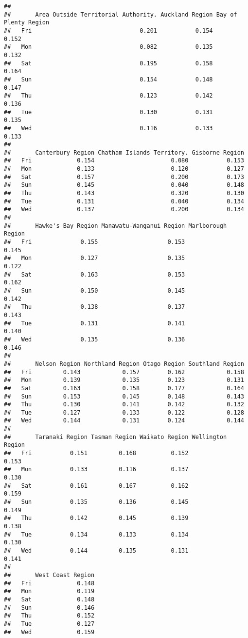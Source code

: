 \documentclass[
  10pt,
]{article}
\begin{document}
\begin{verbatim}
##      
##       Area Outside Territorial Authority. Auckland Region Bay of Plenty Region
##   Fri                               0.201           0.154                0.152
##   Mon                               0.082           0.135                0.132
##   Sat                               0.195           0.158                0.164
##   Sun                               0.154           0.148                0.147
##   Thu                               0.123           0.142                0.136
##   Tue                               0.130           0.131                0.135
##   Wed                               0.116           0.133                0.133
##      
##       Canterbury Region Chatham Islands Territory. Gisborne Region
##   Fri             0.154                      0.080           0.153
##   Mon             0.133                      0.120           0.127
##   Sat             0.157                      0.200           0.173
##   Sun             0.145                      0.040           0.148
##   Thu             0.143                      0.320           0.130
##   Tue             0.131                      0.040           0.134
##   Wed             0.137                      0.200           0.134
##      
##       Hawke's Bay Region Manawatu-Wanganui Region Marlborough Region
##   Fri              0.155                    0.153              0.145
##   Mon              0.127                    0.135              0.122
##   Sat              0.163                    0.153              0.162
##   Sun              0.150                    0.145              0.142
##   Thu              0.138                    0.137              0.143
##   Tue              0.131                    0.141              0.140
##   Wed              0.135                    0.136              0.146
##      
##       Nelson Region Northland Region Otago Region Southland Region
##   Fri         0.143            0.157        0.162            0.158
##   Mon         0.139            0.135        0.123            0.131
##   Sat         0.163            0.158        0.177            0.164
##   Sun         0.153            0.145        0.148            0.143
##   Thu         0.130            0.141        0.142            0.132
##   Tue         0.127            0.133        0.122            0.128
##   Wed         0.144            0.131        0.124            0.144
##      
##       Taranaki Region Tasman Region Waikato Region Wellington Region
##   Fri           0.151         0.168          0.152             0.153
##   Mon           0.133         0.116          0.137             0.130
##   Sat           0.161         0.167          0.162             0.159
##   Sun           0.135         0.136          0.145             0.149
##   Thu           0.142         0.145          0.139             0.138
##   Tue           0.134         0.133          0.134             0.130
##   Wed           0.144         0.135          0.131             0.141
##      
##       West Coast Region
##   Fri             0.148
##   Mon             0.119
##   Sat             0.148
##   Sun             0.146
##   Thu             0.152
##   Tue             0.127
##   Wed             0.159
\end{verbatim}
\end{document}
